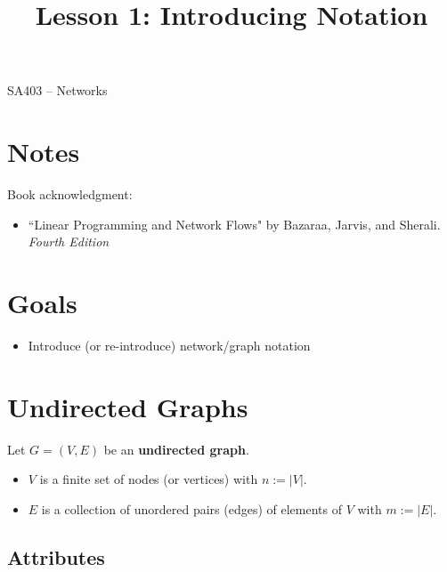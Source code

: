 \documentclass[12pt]{article}
\makeatletter
\theoremstyle{definition}
\newcommand{\graphbox}[5]%
{
\begin{tikzpicture}
     [>=latex,scale=#5]
     
     \draw [->,very thick] (#1, 0) -- (#2, 0) node[right] {$x$};
     \draw [->,very thick] (0, #3) -- (0, #4) node[above] {$y$};
     
     \draw[step=1cm,thick,dotted] (#1,#3) grid (#2,#4);
   \end{tikzpicture}
   }
\renewcommand{\maketitle}{
  \noindent SA403 -- Networks \\

  \begin{center}\Large{\textbf{\@title}}\end{center}
}
\makeatother
\begin{document}

\title{Lesson 1: Introducing Notation}


\maketitle


\section*{Notes}

Book acknowledgment:
\begin{itemize}
	\item[] ``Linear Programming and Network Flows" by Bazaraa, Jarvis, and Sherali. \emph{Fourth Edition}
\end{itemize}
\section*{Goals}
\begin{itemize}
\item  Introduce (or re-introduce) network/graph notation
\end{itemize}

\section{Undirected Graphs}

Let $G = (V,E)$ be an \textbf{undirected graph}.
\begin{itemize}
	\item[] $V$ is a finite set of nodes (or vertices) with $n:= |V|$.
	\item[] $E$ is a collection of unordered pairs (edges) of elements of $V$ with $m:=|E|$.
\end{itemize}
 
\subsection*{Attributes}
\end{document}
